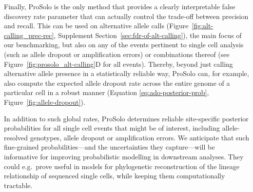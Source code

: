 \documentclass[12pt,inline]{wlscirep}
\begin{document}
Finally, ProSolo is the only method that provides a clearly interpretable false discovery rate parameter that can actually control the trade-off between precision and recall.
This can be used on alternative allele calls (Figure~\ref{fig:alt-calling_prec-rec}, Supplement Section~\ref{sec:fdr-of-alt-calling}), the main focus of our benchmarking, but also on any of the events pertinent to single cell analysis (such as allele dropout or amplification errors) or combinations thereof (see Figure~\ref{fig:prosolo_alt-calling}D for all events).
Thereby, beyond just calling alternative allele presence in a statistically reliable way, ProSolo can, for example, also compute the expected allele dropout rate across the entire genome of a particular cell in a robust manner (Equation \ref{eq:ado-posterior-prob}, Figure~\ref{fig:allele-dropout}).

In addition to such global rates, ProSolo determines reliable site-specific posterior probabilities for all single cell events that might be of interest, including allele-resolved genotypes, allele dropout or amplification errors. 
We anticipate that such fine-grained probabilities---and the uncertainties they capture---will be informative for improving probabilistic modelling in downstream analyses.
They could e.g.~prove useful in models for phylogenetic reconstruction of the lineage relationship of sequenced single cells\cite{singer_single-cell_2018,zafar_siclonefit:_2018,koptagel_scuphr:_2018}, while keeping them computationally tractable\cite{lahnemann_eleven_2020}.
\end{document}
